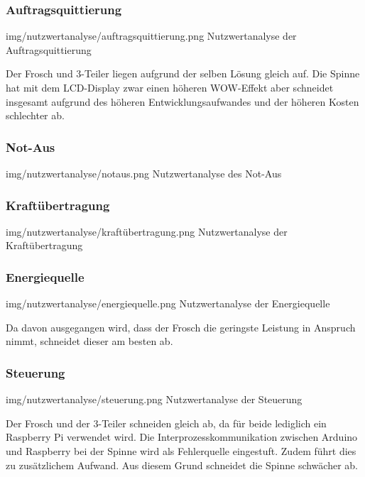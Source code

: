 \subsubsection{Auftragsquittierung}
\image
   {img/nutzwertanalyse/auftragsquittierung.png}
   {Nutzwertanalyse der Auftragsquittierung}
  
Der Frosch und 3-Teiler liegen aufgrund der selben Lösung gleich auf. Die Spinne hat mit dem LCD-Display zwar einen höheren WOW-Effekt aber schneidet insgesamt aufgrund des höheren Entwicklungsaufwandes und der höheren Kosten schlechter ab.
   
\subsubsection{Not-Aus}
\image
   {img/nutzwertanalyse/notaus.png}
   {Nutzwertanalyse des Not-Aus}
   
\subsubsection{Kraftübertragung}
\image
   {img/nutzwertanalyse/kraftübertragung.png}
   {Nutzwertanalyse der Kraftübertragung}
   
\subsubsection{Energiequelle}
\image
   {img/nutzwertanalyse/energiequelle.png}
   {Nutzwertanalyse der Energiequelle}
   
Da davon ausgegangen wird, dass der Frosch die geringste Leistung in Anspruch nimmt, schneidet dieser am besten ab.

\subsubsection{Steuerung}
\image
   {img/nutzwertanalyse/steuerung.png}
   {Nutzwertanalyse der Steuerung}

Der Frosch und der 3-Teiler schneiden gleich ab, da für beide lediglich ein Raspberry Pi verwendet wird. Die Interprozesskommunikation zwischen Arduino und Raspberry bei der Spinne wird als Fehlerquelle eingestuft. Zudem führt dies zu zusätzlichem Aufwand. Aus diesem Grund schneidet die Spinne schwächer ab.

